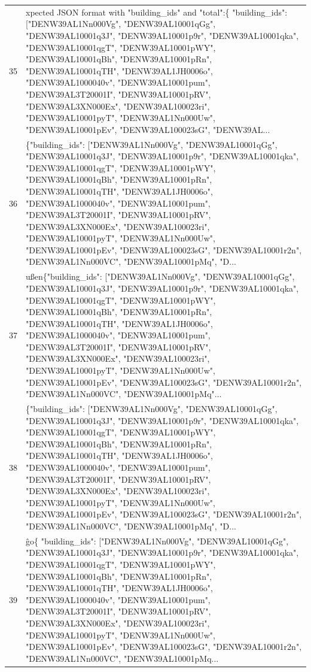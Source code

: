 \documentclass[a4paper,11pt]{article}
\begin{document}
\begin{table}[ht]
\begin{tabular}{r p{12cm}}
35 & xpected JSON format with "building\_ids" and "total":\{ "building\_ids": ["DENW39AL1Nn000Vg", "DENW39AL10001qGg", "DENW39AL10001q3J", "DENW39AL10001p9r", "DENW39AL10001qka", "DENW39AL10001qgT", "DENW39AL10001pWY", "DENW39AL10001qBh", "DENW39AL10001pRn", "DENW39AL10001qTH", "DENW39AL1JH0006o", "DENW39AL1000040v", "DENW39AL10001pum", "DENW39AL3T20001I", "DENW39AL10001pRV", "DENW39AL3XN000Ex", "DENW39AL100023ri", "DENW39AL10001pyT", "DENW39AL1Nn000Uw", "DENW39AL10001pEv", "DENW39AL100023sG", "DENW39AL... \\
36 & \{"building\_ids": ["DENW39AL1Nn000Vg", "DENW39AL10001qGg", "DENW39AL10001q3J", "DENW39AL10001p9r", "DENW39AL10001qka", "DENW39AL10001qgT", "DENW39AL10001pWY", "DENW39AL10001qBh", "DENW39AL10001pRn", "DENW39AL10001qTH", "DENW39AL1JH0006o", "DENW39AL1000040v", "DENW39AL10001pum", "DENW39AL3T20001I", "DENW39AL10001pRV", "DENW39AL3XN000Ex", "DENW39AL100023ri", "DENW39AL10001pyT", "DENW39AL1Nn000Uw", "DENW39AL10001pEv", "DENW39AL100023sG", "DENW39AL10001r2n", "DENW39AL1Nn000VC", "DENW39AL10001pMq", "D... \\
37 & ußen\{"building\_ids": ["DENW39AL1Nn000Vg", "DENW39AL10001qGg", "DENW39AL10001q3J", "DENW39AL10001p9r", "DENW39AL10001qka", "DENW39AL10001qgT", "DENW39AL10001pWY", "DENW39AL10001qBh", "DENW39AL10001pRn", "DENW39AL10001qTH", "DENW39AL1JH0006o", "DENW39AL1000040v", "DENW39AL10001pum", "DENW39AL3T20001I", "DENW39AL10001pRV", "DENW39AL3XN000Ex", "DENW39AL100023ri", "DENW39AL10001pyT", "DENW39AL1Nn000Uw", "DENW39AL10001pEv", "DENW39AL100023sG", "DENW39AL10001r2n", "DENW39AL1Nn000VC", "DENW39AL10001pMq"... \\
38 & \{"building\_ids": ["DENW39AL1Nn000Vg", "DENW39AL10001qGg", "DENW39AL10001q3J", "DENW39AL10001p9r", "DENW39AL10001qka", "DENW39AL10001qgT", "DENW39AL10001pWY", "DENW39AL10001qBh", "DENW39AL10001pRn", "DENW39AL10001qTH", "DENW39AL1JH0006o", "DENW39AL1000040v", "DENW39AL10001pum", "DENW39AL3T20001I", "DENW39AL10001pRV", "DENW39AL3XN000Ex", "DENW39AL100023ri", "DENW39AL10001pyT", "DENW39AL1Nn000Uw", "DENW39AL10001pEv", "DENW39AL100023sG", "DENW39AL10001r2n", "DENW39AL1Nn000VC", "DENW39AL10001pMq", "D... \\
39 & ĝo\{
  "building\_ids": ["DENW39AL1Nn000Vg", "DENW39AL10001qGg", "DENW39AL10001q3J", "DENW39AL10001p9r", "DENW39AL10001qka", "DENW39AL10001qgT", "DENW39AL10001pWY", "DENW39AL10001qBh", "DENW39AL10001pRn", "DENW39AL10001qTH", "DENW39AL1JH0006o", "DENW39AL1000040v", "DENW39AL10001pum", "DENW39AL3T20001I", "DENW39AL10001pRV", "DENW39AL3XN000Ex", "DENW39AL100023ri", "DENW39AL10001pyT", "DENW39AL1Nn000Uw", "DENW39AL10001pEv", "DENW39AL100023sG", "DENW39AL10001r2n", "DENW39AL1Nn000VC", "DENW39AL10001pMq... \\

\end{tabular}
\end{table}
\end{document}
